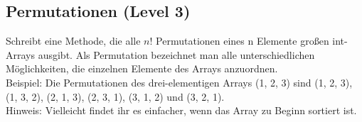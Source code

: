 \subsection{Permutationen (Level 3)}
Schreibt eine Methode, die alle $n!$ Permutationen eines n Elemente großen
int-Arrays ausgibt. Als Permutation bezeichnet man alle unterschiedlichen
Möglichkeiten, die einzelnen Elemente des Arrays anzuordnen.\\
Beispiel: Die Permutationen des drei-elementigen Arrays (1, 2, 3) sind (1, 2, 3),
(1, 3, 2), (2, 1, 3), (2, 3, 1), (3, 1, 2) und (3, 2, 1).\\
Hinweis: Vielleicht findet ihr es einfacher, wenn das Array zu Beginn sortiert ist.
